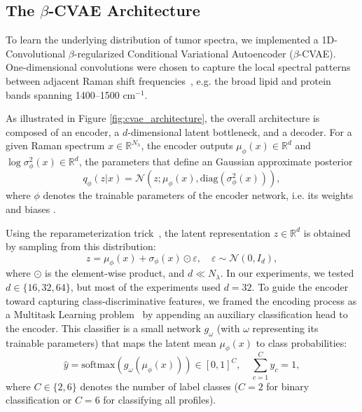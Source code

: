 \documentclass[12pt]{article}
\theoremstyle{paper}
\begin{document}
\subsection{The $\beta$-CVAE Architecture}
\label{sec:cvae_architecture}


To learn the underlying distribution of tumor spectra, we implemented a 1D-Convolutional $\beta$-regularized Conditional Variational Autoencoder ($\beta$-CVAE). One-dimensional convolutions were chosen to capture the local spectral patterns between adjacent Raman shift frequencies~\cite{mozaffari2020review}, e.g. the broad lipid and protein bands spanning 1400--1500 $\text{cm}^{-1}$. 

As illustrated in Figure \ref{fig:cvae_architecture}, the overall architecture is composed of an encoder, a $d$-dimensional latent bottleneck, and a decoder. For a given Raman spectrum $x \in \mathbb{R}^{N_\lambda}$, the encoder outputs $\mu_\phi(x) \in \mathbb{R}^d$ and $\log \sigma_\phi^2(x) \in \mathbb{R}^d$, the parameters that define an Gaussian approximate posterior
\begin{equation}
    q_\phi(z|x) = \mathcal{N}\left(z; \mu_\phi(x), \mathrm{diag}\left(\sigma_\phi^2(x)\right)\right),
\end{equation} where $\phi$ denotes the trainable parameters of the encoder network, i.e. its weights and biases . 

Using the reparameterization trick~\cite{kingma2013auto}, the latent representation $z \in \mathbb{R}^d$ is obtained by sampling from this distribution:
\begin{equation}
    z = \mu_\phi(x) + \sigma_\phi(x) \odot \varepsilon, \quad \varepsilon \sim \mathcal{N}(0, I_d),
\end{equation} where $\odot$ is the element-wise product, and $d \ll N_\lambda$. In our experiments, we tested $d \in \{ 16, 32, 64 \}$, but most of the experiments used $d=32$. To guide the encoder toward capturing class-discriminative features, we framed the encoding process as a Multitask Learning problem~\cite{caruana1997multitask} by appending an auxiliary classification head to the encoder. This classifier is a small network $g_\omega$ (with $\omega$ representing its trainable parameters) that maps the latent mean $\mu_\phi(x)$ to class probabilities: 
\begin{equation}
    \hat{y} = \mathrm{softmax}\left(g_\omega(\mu_\phi(x))\right) \in [0,1]^C, \quad \sum_{c=1}^C \hat{y}_c = 1,
\end{equation} where $C \in \{2, 6\}$ denotes the number of label classes ($C=2$ for binary classification or $C = 6$ for classifying all profiles).
\end{document}
